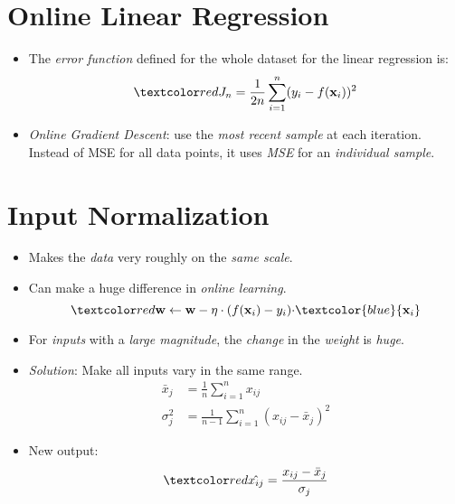 \documentclass[
	number={5},
	title={Linear Regression}
]{cs584notes}
\begin{document}
\section{Online Linear Regression}\label{sec:online-linear-regression}
\begin{itemize}
	\item The \emph{error function} defined for the whole dataset for the linear regression is:
	\[ \data{ J_{n} = \frac{1}{2n}\sum_{i=1}^{n} (y_{i} - f(\vec{x}_{i}))^{2} } \]
	\item \emph{Online Gradient Descent}: use the \emph{most recent sample} at each iteration.
	Instead of MSE for all data points, it uses \emph{MSE} for an \emph{individual sample}.
\end{itemize}

\section{Input Normalization}\label{sec:input-normalization}
\begin{itemize}
	\item Makes the \emph{data} very roughly on the \emph{same scale}.
	\item Can make a huge difference in \emph{online learning}.
	\[ \data{ \vec{w} \gets \vec{w} - \eta \cdot (f(\vec{x}_{i}) - y_{i}) \cdot } \textcolor{blue}{\vec{x}_{i}} \]
	\item For \emph{inputs} with a \emph{large magnitude}, the \emph{change} in the \emph{weight} is \emph{huge}.
	\item \emph{Solution}: Make all inputs vary in the same range.
	\begin{equation}
		\begin{aligned}
			\bar{x}_{j} &= \frac{1}{n}\sum_{i=1}^{n} x_{ij}\\
			\sigma_{j}^{2} &= \frac{1}{n-1} \sum_{i=1}^{n} (x_{ij} - \bar{x}_{j})^{2}
		\end{aligned}
		\label{eq:normalization}
	\end{equation}
	\item New output:
	\[ \data{ \tildehat{x_{ij}} = \frac{x_{ij} - \bar{x}_{j}}{\sigma_{j}} } \]
\end{itemize}
\end{document}
